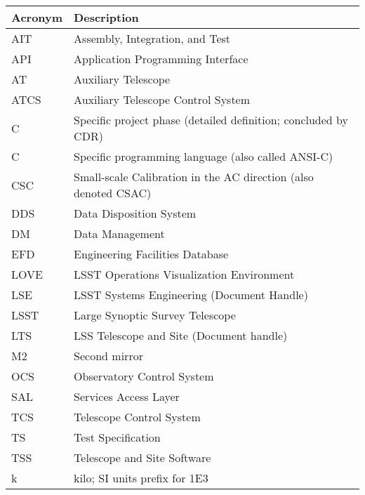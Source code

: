\addtocounter{table}{-1}
\begin{longtable}{|l|p{}|}\hline
\textbf{Acronym} & \textbf{Description}  \\\hline

AIT & Assembly, Integration, and Test \\\hline
API & Application Programming Interface \\\hline
AT & Auxiliary Telescope \\\hline
ATCS & Auxiliary Telescope Control System \\\hline
C & Specific project phase (detailed definition; concluded by CDR) \\\hline
C & Specific programming language (also called ANSI-C) \\\hline
CSC & Small-scale Calibration in the AC direction (also denoted CSAC) \\\hline
DDS & Data Disposition System \\\hline
DM & Data Management \\\hline
EFD & Engineering Facilities Database \\\hline
LOVE & LSST Operations Visualization Environment \\\hline
LSE & LSST Systems Engineering (Document Handle) \\\hline
LSST & Large Synoptic Survey Telescope \\\hline
LTS & LSS Telescope and Site (Document handle) \\\hline
M2 & Second mirror \\\hline
OCS & Observatory Control System \\\hline
SAL & Services Access Layer \\\hline
TCS & Telescope Control System \\\hline
TS & Test Specification \\\hline
TSS & Telescope and Site Software \\\hline
k & kilo; SI units prefix for 1E3 \\\hline
\end{longtable}
